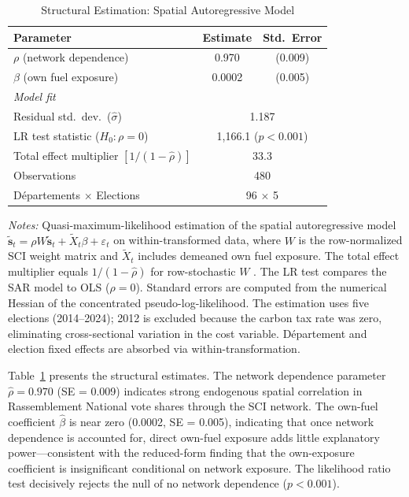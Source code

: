 \documentclass[12pt]{article}
\newcommand{\rn}{Rassemblement National}
\newcommand{\Dept}{D\'{e}partement}
\newcommand{\Depts}{D\'{e}partements}
\begin{document}
\begin{table}[H]
\centering
\caption{Structural Estimation: Spatial Autoregressive Model}
\label{tab:structural}
\begin{threeparttable}
\begin{tabular}{lcc}
\toprule
Parameter & Estimate & Std.\ Error \\
\midrule
$\rho$ (network dependence) & 0.970 & (0.009) \\
$\beta$ (own fuel exposure) & 0.0002 & (0.005) \\
\midrule
\multicolumn{3}{l}{\textit{Model fit}} \\
Residual std.\ dev.\ ($\hat{\sigma}$) & \multicolumn{2}{c}{1.187} \\
LR test statistic ($H_0: \rho = 0$) & \multicolumn{2}{c}{1{,}166.1 ($p < 0.001$)} \\
Total effect multiplier $[1/(1-\hat{\rho})]$ & \multicolumn{2}{c}{33.3} \\
Observations & \multicolumn{2}{c}{480} \\
\Depts{} $\times$ Elections & \multicolumn{2}{c}{96 $\times$ 5} \\
\bottomrule
\end{tabular}
\begin{tablenotes}[flushleft]
\small
\item \textit{Notes:} Quasi-maximum-likelihood estimation of the spatial autoregressive model $\tilde{\mathbf{s}}_t = \rho W \tilde{\mathbf{s}}_t + \tilde{X}_t \beta + \varepsilon_t$ on within-transformed data, where $W$ is the row-normalized SCI weight matrix and $\tilde{X}_t$ includes demeaned own fuel exposure. The total effect multiplier equals $1/(1-\hat{\rho})$ for row-stochastic $W$ \citep{lesage2009introduction}. The LR test compares the SAR model to OLS ($\rho = 0$). Standard errors are computed from the numerical Hessian of the concentrated pseudo-log-likelihood. The estimation uses five elections (2014--2024); 2012 is excluded because the carbon tax rate was zero, eliminating cross-sectional variation in the cost variable. \Dept{} and election fixed effects are absorbed via within-transformation.
\end{tablenotes}
\end{threeparttable}
\end{table}

Table~\ref{tab:structural} presents the structural estimates. The network dependence parameter $\hat{\rho} = 0.970$ (SE = 0.009) indicates strong endogenous spatial correlation in \rn{} vote shares through the SCI network. The own-fuel coefficient $\hat{\beta}$ is near zero (0.0002, SE = 0.005), indicating that once network dependence is accounted for, direct own-fuel exposure adds little explanatory power---consistent with the reduced-form finding that the own-exposure coefficient is insignificant conditional on network exposure. The likelihood ratio test decisively rejects the null of no network dependence ($p < 0.001$).
\end{document}
